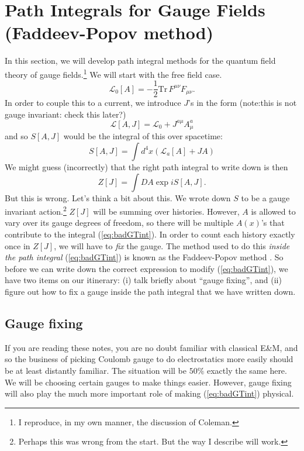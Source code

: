 \documentclass[main.tex]{subfiles}
\begin{document}
\section{Path Integrals for Gauge Fields (Faddeev-Popov method)}
In this section, we will develop path integral methods for the quantum field theory of gauge fields.\footnote{I reproduce, in my own manner, the discussion of Coleman\cite{Co1}.} We will start with the free field case.
\[
\mathcal{L}_0 [A] = -\frac{1}{2} \text{Tr}\, F^{\mu \nu} F_{\mu \nu}.
\]
In order to couple this to a current, we introduce $J$'s in the form (note:this is not gauge invariant: check this later?)
\[
\mathcal{L} [A,J] = \mathcal{L}_0 + J^{a \mu} A^a_\mu
\]
and so $S[A,J]$ would be the integral of this over spacetime:
\[
S[A,J] = \int d^4 x \left( \mathcal{L}_a [A] + JA \right)
\]
We might guess (incorrectly) that the right path integral to write down is then
\label{eq:badGTint} %
\begin{equation}
Z[J] = \int DA  \exp{iS[A,J]}.
\end{equation}
But this is wrong. Let's think a bit about this. We wrote down $S$ to be a gauge invariant action.\footnote{Perhaps this was wrong from the start. But the way I describe will work.} $Z[J]$ will be summing over histories. However, $A$ is allowed to vary over its gauge degrees of freedom, so there will be multiple $A(x)$'s that contribute to the integral (\ref{eq:badGTint}). In order to count each history exactly once in $Z[J]$, we will have to \textit{fix} the gauge. The method used to do this \textit{inside the path integral} (\ref{eq:badGTint}) is known as the Faddeev-Popov method \cite{FaPo}. So before we can write down the correct expression to modify (\ref{eq:badGTint}), we have two items on our itinerary: (i) talk briefly about ``gauge fixing'', and (ii) figure out how to fix a gauge inside the path integral that we have written down.

\subsection{Gauge fixing}
If you are reading these notes, you are no doubt familiar with classical E\&M, and so the business of picking Coulomb gauge to do electrostatics more easily should be at least distantly familiar. The situation will be $50 \%$ exactly the same here. We will be choosing certain gauges to make things easier. However, gauge fixing will also play the much more important role of making (\ref{eq:badGTint}) physical. 
\end{document}

